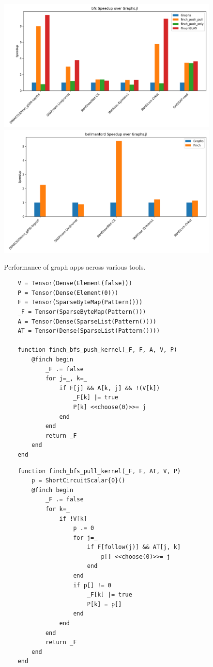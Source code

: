 \begin{figure}
	\includegraphics[width=0.5\linewidth]{bfs_speedup_over_graphs.jl.png}%
	\includegraphics[width=0.5\linewidth]{bellmanford_speedup_over_graphs.jl.png}
    \caption{Performance of graph apps across various tools.}
     \label{graph_result}
\end{figure}

\begin{figure}
    \begin{minipage}{0.5\linewidth}
    \begin{verbatim}
    V = Tensor(Dense(Element(false)))
    P = Tensor(Dense(Element(0)))
    F = Tensor(SparseByteMap(Pattern()))
    _F = Tensor(SparseByteMap(Pattern()))
    A = Tensor(Dense(SparseList(Pattern())))
    AT = Tensor(Dense(SparseList(Pattern())))

    function finch_bfs_push_kernel(_F, F, A, V, P)
        @finch begin
            _F .= false
            for j=_, k=_
                if F[j] && A[k, j] && !(V[k])
                    _F[k] |= true
                    P[k] <<choose(0)>>= j
                end
            end
            return _F
        end
    end

    \end{verbatim}
\end{minipage}%
\begin{minipage}{0.5\linewidth}
    \begin{verbatim}
    function finch_bfs_pull_kernel(_F, F, AT, V, P)
        p = ShortCircuitScalar{0}()
        @finch begin
            _F .= false
            for k=_
                if !V[k]
                    p .= 0
                    for j=_
                        if F[follow(j)] && AT[j, k]
                            p[] <<choose(0)>>= j
                        end
                    end
                    if p[] != 0
                        _F[k] |= true
                        P[k] = p[]
                    end
                end
            end
            return _F
        end
    end
    \end{verbatim}
\end{minipage}
\end{figure}

